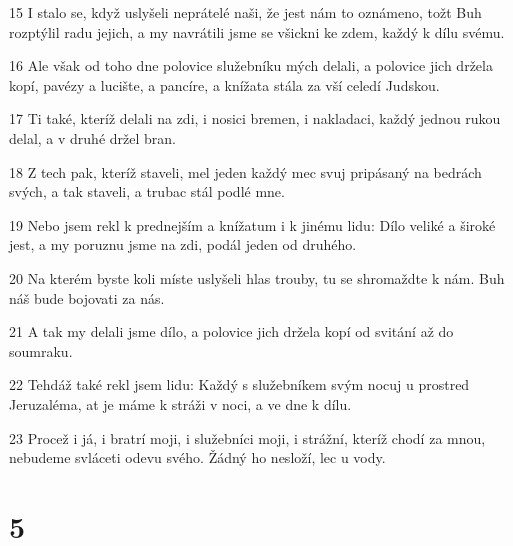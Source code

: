 \par 15 I stalo se, když uslyšeli neprátelé naši, že jest nám to oznámeno, tožt Buh rozptýlil radu jejich, a my navrátili jsme se všickni ke zdem, každý k dílu svému.
\par 16 Ale však od toho dne polovice služebníku mých delali, a polovice jich držela kopí, pavézy a lucište, a pancíre, a knížata stála za vší celedí Judskou.
\par 17 Ti také, kteríž delali na zdi, i nosici bremen, i nakladaci, každý jednou rukou delal, a v druhé držel bran.
\par 18 Z tech pak, kteríž staveli, mel jeden každý mec svuj pripásaný na bedrách svých, a tak staveli, a trubac stál podlé mne.
\par 19 Nebo jsem rekl k prednejším a knížatum i k jinému lidu: Dílo veliké a široké jest, a my poruznu jsme na zdi, podál jeden od druhého.
\par 20 Na kterém byste koli míste uslyšeli hlas trouby, tu se shromaždte k nám. Buh náš bude bojovati za nás.
\par 21 A tak my delali jsme dílo, a polovice jich držela kopí od svitání až do soumraku.
\par 22 Tehdáž také rekl jsem lidu: Každý s služebníkem svým nocuj u prostred Jeruzaléma, at je máme k stráži v noci, a ve dne k dílu.
\par 23 Procež i já, i bratrí moji, i služebníci moji, i strážní, kteríž chodí za mnou, nebudeme svláceti odevu svého. Žádný ho nesloží, lec u vody.

\chapter{5}

